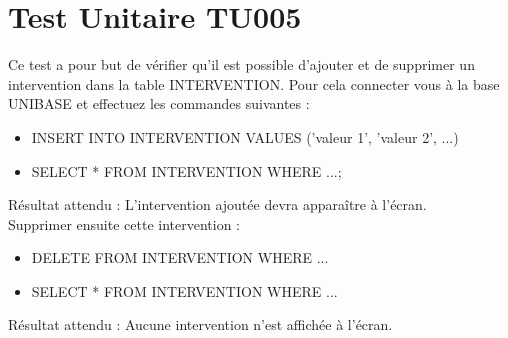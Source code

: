 	
\section{Test Unitaire TU005}
	Ce test a pour but de vérifier qu'il est possible d'ajouter et de supprimer un intervention dans la table INTERVENTION. Pour cela connecter vous à la base UNIBASE et effectuez les commandes suivantes : \\
	
	\begin{itemize}
		\item INSERT INTO INTERVENTION VALUES ('valeur 1', 'valeur 2', ...)
		\item SELECT * FROM INTERVENTION WHERE ...;
	\end{itemize}
	
	Résultat attendu : L'intervention ajoutée devra apparaître à l'écran. \\
	
	Supprimer ensuite cette intervention : \\
	
	\begin{itemize}
		\item DELETE FROM INTERVENTION WHERE ...
		\item SELECT * FROM INTERVENTION WHERE ...
	\end{itemize}	 
	
	Résultat attendu : Aucune intervention n'est affichée à l'écran.